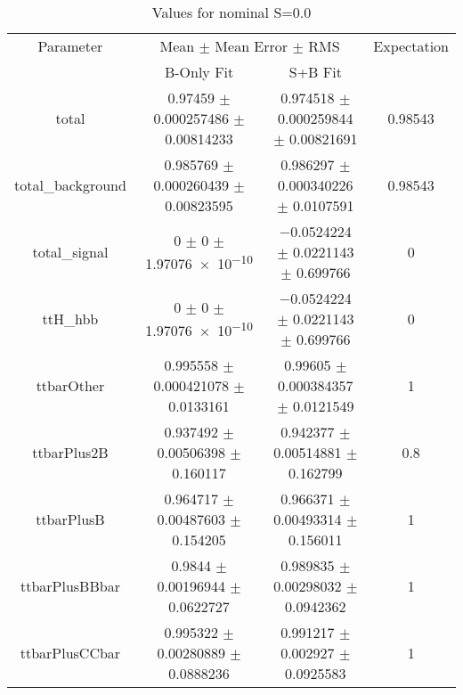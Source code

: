 \begin{table}
\centering
\caption{Values for nominal S=0.0}
\begin{tabular}{cccc}
\toprule
Parameter & \multicolumn{2}{c}{Mean $\pm$ Mean Error $\pm$ RMS} & Expectation\\
 & B-Only Fit & S+B Fit & \\
\midrule
total & \num{0.97459} $\pm$ \num{0.000257486} $\pm$ \num{0.00814233} & \num{0.974518} $\pm$ \num{0.000259844} $\pm$ \num{0.00821691} & \num{0.98543}\\
total\_background & \num{0.985769} $\pm$ \num{0.000260439} $\pm$ \num{0.00823595} & \num{0.986297} $\pm$ \num{0.000340226} $\pm$ \num{0.0107591} & \num{0.98543}\\
total\_signal & \num{0} $\pm$ \num{0} $\pm$ \num{1.97076e-10} & \num{-0.0524224} $\pm$ \num{0.0221143} $\pm$ \num{0.699766} & \num{0}\\
ttH\_hbb & \num{0} $\pm$ \num{0} $\pm$ \num{1.97076e-10} & \num{-0.0524224} $\pm$ \num{0.0221143} $\pm$ \num{0.699766} & \num{0}\\
ttbarOther & \num{0.995558} $\pm$ \num{0.000421078} $\pm$ \num{0.0133161} & \num{0.99605} $\pm$ \num{0.000384357} $\pm$ \num{0.0121549} & \num{1}\\
ttbarPlus2B & \num{0.937492} $\pm$ \num{0.00506398} $\pm$ \num{0.160117} & \num{0.942377} $\pm$ \num{0.00514881} $\pm$ \num{0.162799} & \num{0.8}\\
ttbarPlusB & \num{0.964717} $\pm$ \num{0.00487603} $\pm$ \num{0.154205} & \num{0.966371} $\pm$ \num{0.00493314} $\pm$ \num{0.156011} & \num{1}\\
ttbarPlusBBbar & \num{0.9844} $\pm$ \num{0.00196944} $\pm$ \num{0.0622727} & \num{0.989835} $\pm$ \num{0.00298032} $\pm$ \num{0.0942362} & \num{1}\\
ttbarPlusCCbar & \num{0.995322} $\pm$ \num{0.00280889} $\pm$ \num{0.0888236} & \num{0.991217} $\pm$ \num{0.002927} $\pm$ \num{0.0925583} & \num{1}\\
\bottomrule
\end{tabular}
\end{table}